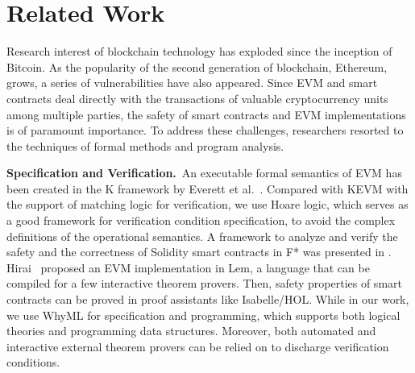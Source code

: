 \documentclass[runningheads]{llncs}
\begin{document}
\section{Related Work}\label{Sec: Related}

Research interest of blockchain technology has exploded since the inception of Bitcoin. 
As the popularity of the second generation of blockchain, 
Ethereum, grows, a series of vulnerabilities have also appeared. 
Since EVM and smart contracts deal directly with the transactions of valuable cryptocurrency units 
among multiple parties, 
the safety of smart contracts and EVM implementations is of paramount importance. 
To address these challenges, 
researchers resorted to the techniques of formal methods and program analysis. 

\noindent\textbf{Specification and Verification.}~An executable formal semantics of EVM has been 
created in the K framework by Everett et al.~\cite{hildenbrandt2017kevm}. 
Compared with KEVM with the support
of matching logic for verification, we use Hoare logic, which serves as a good framework for
verification condition specification, to avoid the complex definitions
of the operational semantics. 
A framework to analyze and verify the safety and the correctness of 
Solidity smart contracts in F*
was presented in \cite{bhargavan2016formal}.
Hirai~\cite{hirai2017defining} proposed an EVM implementation in Lem, a language that can be compiled for 
a few interactive theorem provers. Then, safety properties of smart contracts can be proved in proof assistants like Isabelle/HOL.
While in our work, we use WhyML for specification and programming, which supports both logical theories 
and programming data structures. Moreover, both automated and interactive external theorem provers 
can be relied on to discharge verification conditions. 
\end{document}
